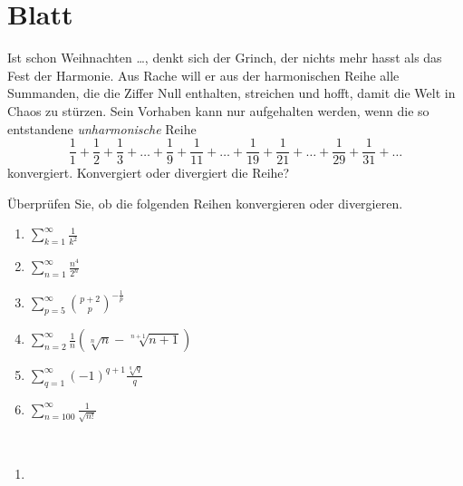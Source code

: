 \section{Blatt}

\begin{aufg}[6 Punkte]
\glqq Ist schon Weihnachten \ldots\grqq, denkt sich der Grinch, der nichts mehr hasst als das Fest der Harmonie. Aus Rache will er aus der harmonischen Reihe alle Summanden, die die Ziffer Null enthalten, streichen und hofft, damit die Welt in Chaos zu st\"urzen. Sein Vorhaben kann nur aufgehalten werden, wenn die so entstandene \emph{unharmonische} Reihe
\[
 \frac{1}{1} + \frac{1}{2} + \frac{1}{3} + \ldots + \frac{1}{9} + \frac{1}{11} + \ldots + \frac{1}{19} + \frac{1}{21} + \ldots + \frac{1}{29} + \frac{1}{31} + \ldots
\]
konvergiert. Konvergiert oder divergiert die Reihe?
\end{aufg}

\bigskip

\begin{lsg}
\end{lsg}


\bigskip


\begin{aufg}[6 Punkte]
\"Uberpr\"ufen Sie, ob die folgenden Reihen konvergieren oder divergieren.
\begin{enumerate}[label=$\mathrm{(\roman*)}$, ref=$\mathrm{\roman*}$]
\item $\sum\limits_{k=1}^\infty \frac{1}{k^2}$
\item $\sum\limits_{n=1}^\infty \frac{n^4}{2^n}$
\item $\sum\limits_{p=5}^\infty \binom{p+2}{p}^{-\frac1p}$
\item $\sum\limits_{n=2}^\infty \frac1n \left( \sqrt[n]{n} - \sqrt[n+1]{n+1} \right)$
\item $\sum\limits_{q=1}^\infty (-1)^{q+1} \frac{\sqrt[q]{q}}{q}$
\item $\sum\limits_{n=100}^\infty \frac{1}{\sqrt{n!}}$
\end{enumerate}
\end{aufg}

\bigskip

\begin{lsg}\mbox{ }
\begin{enumerate}[label=$\mathrm{(\roman*)}$, ref=$\mathrm{\roman*}$]
\item 
\end{enumerate}
\end{lsg}

